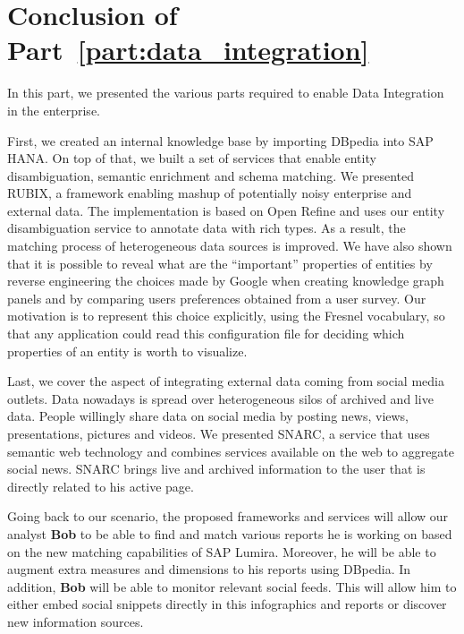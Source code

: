 \chapter*{Conclusion of Part~\ref{part:data_integration}}

In this part, we presented the various parts required to enable Data Integration in the enterprise.

First, we created an internal knowledge base by importing DBpedia into SAP HANA. On top of that, we built a set of services that enable entity disambiguation, semantic enrichment and schema matching. We presented RUBIX, a framework enabling mashup of potentially noisy enterprise and external data. The implementation is based on Open Refine and uses our entity disambiguation service to annotate data with rich types. As a result, the matching process of heterogeneous data sources is improved. We have also shown that it is possible to reveal what are the ``important'' properties of entities by reverse engineering the choices made by Google when creating knowledge graph panels and by comparing  users preferences obtained from a user survey. Our motivation is to represent this choice explicitly, using the Fresnel vocabulary, so that any application could read this configuration file for deciding which properties of an entity is worth to visualize.

Last, we cover the aspect of integrating external data coming from social media outlets. Data nowadays is spread over heterogeneous silos of archived and live data. People willingly share data on social media by posting news, views, presentations, pictures and videos. We presented SNARC, a service that uses semantic web technology and combines services available on the web to aggregate social news. SNARC brings live and archived information to the user that is directly related to his active page.

Going back to our scenario, the proposed frameworks and services will allow our analyst \textbf{Bob} to be able to find and match various reports he is working on based on the new matching capabilities of SAP Lumira. Moreover, he will be able to augment extra measures and dimensions to his reports using DBpedia. In addition, \textbf{Bob} will be able to monitor relevant social feeds. This will allow him to either embed social snippets directly in this infographics and reports or discover new information sources.